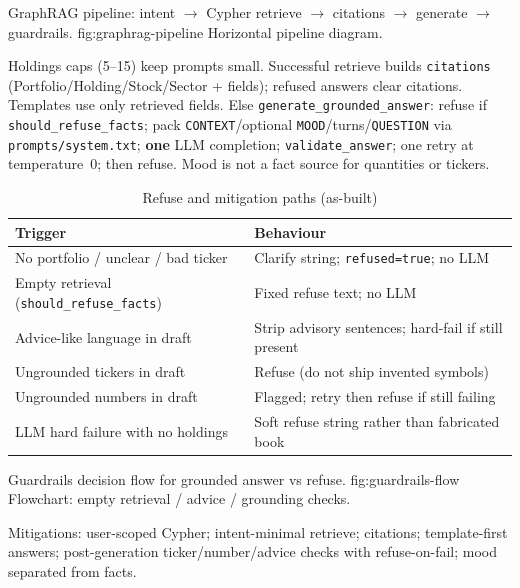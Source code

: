 %
{GraphRAG pipeline: intent $\rightarrow$ Cypher retrieve $\rightarrow$ citations $\rightarrow$ generate $\rightarrow$ guardrails.}%
{fig:graphrag-pipeline}%
{Horizontal pipeline diagram.}

\noindent
Holdings caps (5--15) keep prompts small. Successful retrieve builds \texttt{citations} (Portfolio/Holding/Stock/Sector + fields); refused answers clear citations. Templates use only retrieved fields. Else \texttt{generate\_grounded\_answer}: refuse if \texttt{should\_refuse\_facts}; pack \texttt{CONTEXT}/optional \texttt{MOOD}/turns/\texttt{QUESTION} via \texttt{prompts/system.txt}; \textbf{one} LLM completion; \texttt{validate\_answer}; one retry at temperature~0; then refuse. Mood is not a fact source for quantities or tickers.

\begin{table}[!htbp]
\centering
\small
\caption{Refuse and mitigation paths (as-built)}
\label{tab:refuse-paths}
\begin{tabularx}{\textwidth}{@{}
  >{\raggedright\arraybackslash}p{}
  >{\raggedright\arraybackslash}X
  @{}}
\toprule
\textbf{Trigger} & \textbf{Behaviour} \\
\midrule
No portfolio / unclear / bad ticker & Clarify string; \texttt{refused=true}; no LLM \\
\addlinespace
Empty retrieval (\texttt{should\_refuse\_facts}) & Fixed refuse text; no LLM \\
\addlinespace
Advice-like language in draft & Strip advisory sentences; hard-fail if still present \\
\addlinespace
Ungrounded tickers in draft & Refuse (do not ship invented symbols) \\
\addlinespace
Ungrounded numbers in draft & Flagged; retry then refuse if still failing \\
\addlinespace
LLM hard failure with no holdings & Soft refuse string rather than fabricated book \\
\bottomrule
\end{tabularx}
\end{table}

%
{Guardrails decision flow for grounded answer vs refuse.}%
{fig:guardrails-flow}%
{Flowchart: empty retrieval / advice / grounding checks.}

\noindent
Mitigations: user-scoped Cypher; intent-minimal retrieve; citations; template-first answers; post-generation ticker/number/advice checks with refuse-on-fail; mood separated from facts.